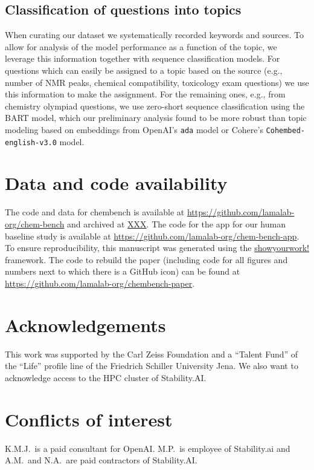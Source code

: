 \documentclass[11pt, oneside]{article}
\begin{document}
\subsection{Classification of questions into topics}\label{sec:meth-topic} When curating our dataset we systematically recorded keywords and sources.
To allow for analysis of the model performance as a function of the topic, we leverage this information together with sequence classification models.
For questions which can easily be assigned to a topic based on the source (e.g., number of NMR peaks, chemical compatibility, toxicology exam questions) we use this information to make the assignment.
For the remaining ones, e.g., from chemistry olympiad questions, we use zero-short sequence classification\cite{zeroshotsequence} using the BART model\cite{bart, FacebookBART}, which our preliminary analysis found to be more robust than topic modeling based on embeddings from OpenAI's \texttt{ada} model or Cohere's \texttt{Cohembed-english-v3.0} model.


\section*{Data and code availability}
The code and data for chembench is available at \url{https://github.com/lamalab-org/chem-bench} and archived at \url{XXX}.
The code for the app for our human baseline study is available at \url{https://github.com/lamalab-org/chem-bench-app}. 
To ensure reproducibility, this manuscript was generated using the \href{https://show-your.work/en/latest/}{showyourwork!} framework.\cite{Luger2021}
The code to rebuild the paper (including code for all figures and numbers next to which there is a GitHub icon) can be found at \url{https://github.com/lamalab-org/chembench-paper}.

\section*{Acknowledgements}
This work was supported by the Carl Zeiss Foundation and a \enquote{Talent Fund} of the \enquote{Life} profile line of the Friedrich Schiller University Jena.
We also want to acknowledge access to the HPC cluster of Stability.AI.

\section*{Conflicts of interest}
K.M.J.\ is a paid consultant for OpenAI. M.P.\ is employee of Stability.ai and A.M.\ and N.A.\ are paid contractors of Stability.AI.
\end{document}
